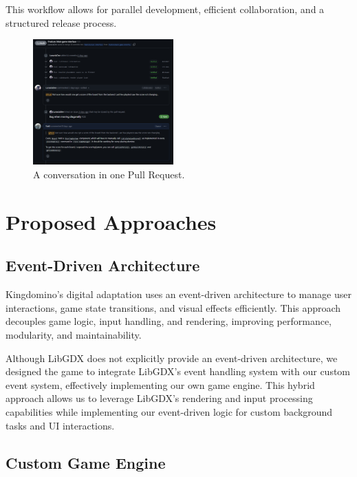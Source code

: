 \documentclass[conference]{IEEEtran}
\begin{document}
This workflow allows for parallel development, efficient collaboration, and a
structured release process.

\begin{figure}[htbp]
    \centerline{\includegraphics[width=0.48\textwidth]{assets/github-pr.png}}
    \caption{A conversation in one Pull Request.}\label{fig:github-pr}
\end{figure}

\section{Proposed Approaches}
\label{sec:proposed_approaches}

\subsection{Event-Driven Architecture}

Kingdomino’s digital adaptation uses an event-driven architecture to manage
user interactions, game state transitions, and visual effects efficiently. This
approach decouples game logic, input handling, and rendering, improving
performance, modularity, and maintainability.

Although LibGDX does not explicitly provide an event-driven architecture, we
designed the game to integrate LibGDX's event handling system with our custom
event system, effectively implementing our own game engine. This hybrid
approach allows us to leverage LibGDX's rendering and input processing
capabilities while implementing our event-driven logic for custom background
tasks and UI interactions.

\subsection{Custom Game Engine}
\end{document}
